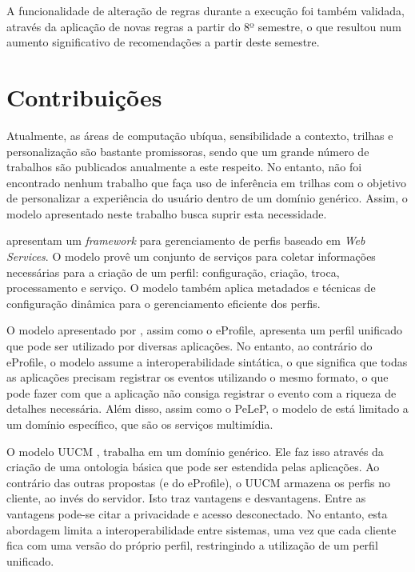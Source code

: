 A funcionalidade de alteração de regras durante a execução foi também validada, através da aplicação de novas regras a partir do 8º semestre, o que resultou num aumento significativo de recomendações a partir deste semestre.


\section{Contribuições} \label{sec:contribuicoes}

Atualmente, as áreas de computação ubíqua, sensibilidade a contexto, trilhas e personalização são bastante promissoras, sendo que um grande número de trabalhos são publicados anualmente a este respeito. No entanto, não foi encontrado nenhum trabalho que faça uso de inferência em trilhas com o objetivo de personalizar a experiência do usuário dentro de um domínio genérico. Assim, o modelo apresentado neste trabalho busca suprir esta necessidade.

 apresentam um {\it framework} para gerenciamento de perfis baseado em {\it Web Services}. O modelo provê um conjunto de serviços para coletar informações necessárias para a criação de um perfil: configuração, criação, troca, processamento e serviço. O modelo também aplica metadados e técnicas de configuração dinâmica para o gerenciamento eficiente dos perfis.

O modelo apresentado por , assim como o eProfile, apresenta um perfil unificado que pode ser utilizado por diversas aplicações. No entanto, ao contrário do eProfile, o modelo assume a interoperabilidade sintática, o que significa que todas as aplicações precisam registrar os eventos utilizando o mesmo formato, o que pode fazer com que a aplicação não consiga registrar o evento com a riqueza de detalhes necessária. Além disso, assim como o PeLeP, o modelo de  está limitado a um domínio específico, que são os serviços multimídia.

O modelo UUCM \cite{niederee04}, trabalha em um domínio genérico. Ele faz isso através da criação de uma ontologia básica que pode ser estendida pelas aplicações. Ao contrário das outras propostas (e do eProfile), o UUCM armazena os perfis no cliente, ao invés do servidor. Isto traz vantagens e desvantagens. Entre as vantagens pode-se citar a privacidade e acesso desconectado. No entanto, esta abordagem limita a interoperabilidade entre sistemas, uma vez que cada cliente fica com uma versão do próprio perfil, restringindo a utilização de um perfil unificado.

